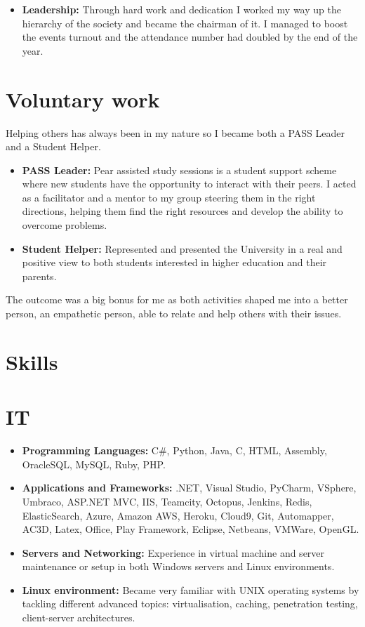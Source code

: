 \documentclass[12pt,a4paper]{res}
\begin{document}
\begin{resume}
\begin{itemize}
      \item {\bf Leadership:} Through hard work and dedication I worked my way up the hierarchy of the society and became the chairman of it. I managed to boost the events turnout and the attendance number had doubled by the end of the year.
     \end{itemize}

\section{\large\bf Voluntary work}
\vspace{2mm}
Helping others has always been in my nature so I became both a PASS Leader and a Student Helper.
      \begin{itemize}
      \item {\bf PASS Leader:} Pear assisted study sessions is a student support scheme where new students have the opportunity to interact with their peers. I acted as a facilitator and a mentor to my group steering them in the right directions, helping them find the right resources and develop the ability to overcome problems.
      \item {\bf Student Helper:} Represented and presented the University in a real
    and positive view to both students interested in higher education and their parents. 
      \end{itemize}
\vspace{-3mm}
    The outcome was a big bonus for me as both activities shaped me into a better person, an empathetic person, able to relate and
    help others with their issues.
    \vspace{-3mm}

\section{\large\bf Skills}
\vspace{2mm}
\section{IT}
\vspace{-1mm}
  \begin{itemize}

  \item[] {\bf Programming Languages:} C\#, Python, Java, C, HTML, Assembly, OracleSQL, MySQL, Ruby, PHP.
  \item[] {\bf Applications and Frameworks:} .NET, Visual Studio, PyCharm, VSphere, Umbraco, ASP.NET MVC, IIS, Teamcity, Octopus, Jenkins, Redis, ElasticSearch, Azure, Amazon AWS, Heroku, Cloud9, Git, Automapper, AC3D, Latex, Office, Play Framework, Eclipse, Netbeans, VMWare, OpenGL.
  \item[] {\bf Servers and Networking:} Experience in virtual machine and server maintenance or setup in both Windows servers and Linux environments.
  \item[] {\bf Linux environment:} Became very familiar with UNIX operating systems by tackling different advanced topics: virtualisation, caching, penetration testing, client-server architectures.


\end{itemize}
\end{resume}
\end{document}
